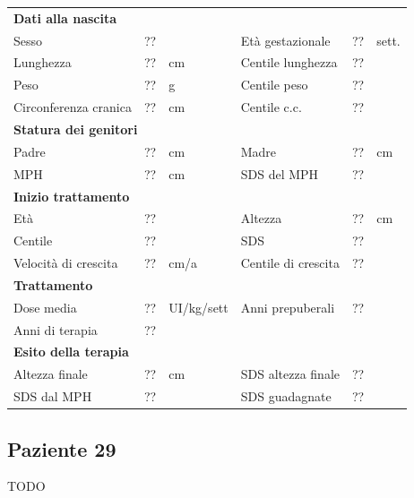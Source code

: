 \begin{table}[!h]
\begin{tabular}{lrllrl}
\toprule
\multicolumn{6}{l}{\textbf{Dati alla nascita}}\\
Sesso 		& \multicolumn{2}{l}{??} 	& Età gestazionale 		& ?? 		& sett.\\
Lunghezza 	& ?? 		& cm 				& Centile lunghezza		& ?? 		\\
Peso 		& ?? 		& g					& Centile peso			& ?? 		\\
Circonferenza cranica	& ?? 		& cm 	& Centile c.c.			& ?? \\
\midrule
\multicolumn{6}{l}{\textbf{Statura dei genitori}}\\
Padre 		& ?? & cm 	& Madre 				& ?? & cm \\
MPH 		& ?? & cm 	& SDS del MPH 			& ??\\
\midrule
\multicolumn{6}{l}{\textbf{Inizio trattamento}} \\
Età	& ?? & 		& Altezza 				& ?? & cm  \\
Centile & ?? 	 &		& SDS		& ?? \\
Velocità di crescita & ?? & cm/a	& Centile di crescita & ??\\
\midrule
\multicolumn{6}{l}{\textbf{Trattamento}} \\
Dose media		& ?? & UI/kg/sett & Anni prepuberali & ??\\
Anni di terapia & ??\\
\midrule
\multicolumn{6}{l}{\textbf{Esito della terapia}} \\
Altezza finale			& ?? & cm 	& SDS altezza finale		& ??\\
SDS dal MPH				& ?? &		& SDS guadagnate 			& ??\\
\bottomrule
\end{tabular}
\end{table}
\clearpage


\subsection*{Paziente 29}

TODO

